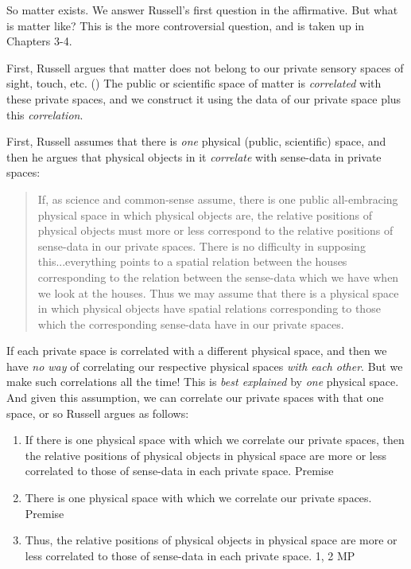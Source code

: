 \documentclass[oneside,letterpaper,12pt]{book}
\begin{document}
\par So matter exists. We answer Russell's first question in the affirmative. But what is matter like? This is the more controversial question, and is taken up in Chapters 3-4. 
\par First, Russell argues that matter does not belong to our private sensory spaces of sight, touch, etc. (\pageref{light}) The public or scientific space of matter is \textit{correlated} with these private spaces, and we construct it using the data of our private space plus this \textit{correlation}.
\par First, Russell assumes that there is \textit{one} physical (public, scientific) space, and then he argues that physical objects in it \textit{correlate} with sense-data in private spaces:
\begin{quote}
	If, as science and common-sense assume, there is one public all-embracing physical space in which physical objects are, the relative positions of physical objects must more or less correspond to the relative positions of sense-data in our private spaces. There is no difficulty in supposing this...everything points to a spatial relation between the houses corresponding to the relation between the sense-data which we have when we look at the houses. Thus we may assume that there is a physical space in which physical objects have spatial relations corresponding to those which the corresponding sense-data have in our private spaces. \pageref{onespace}
\end{quote}
If each private space is correlated with a different physical space, and then we have \textit{no way} of correlating our respective physical spaces \textit{with each other}. But we make such correlations all the time! This is \textit{best explained} by \textit{one} physical space. And given this assumption, we can correlate our private spaces with that one space, or so Russell argues as follows:
\begin{enumerate} %
	\item If there is one physical space with which we correlate our private spaces, then the relative positions of physical objects in physical space are more or less correlated to those of sense-data in each private space. \hfill Premise
	\item There is one physical space with which we correlate our private spaces. \hfill Premise
	\item Thus, the relative positions of physical objects in physical space are more or less correlated to those of sense-data in each private space. \hfill 1, 2 MP
\end{enumerate}
\end{document}

